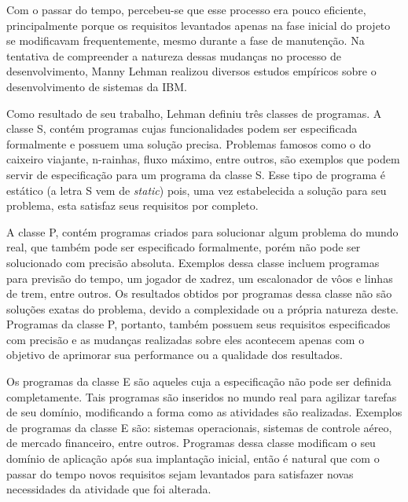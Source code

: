 \documentclass[a4paper, 12pt, twoside]{book}
\begin{document}
        Com o passar do tempo, percebeu-se que esse processo era pouco eficiente, 
        principalmente porque os requisitos levantados apenas na fase inicial do projeto se 
        modificavam frequentemente, mesmo durante a fase de manutenção. Na tentativa de compreender
        a natureza dessas mudanças no processo de desenvolvimento, Manny Lehman realizou diversos 
        estudos empíricos sobre o desenvolvimento de sistemas da IBM.
        
        Como resultado de seu trabalho, Lehman definiu três classes de programas. A classe S, contém 
        programas cujas funcionalidades podem ser especificada formalmente e possuem uma solução
        precisa. Problemas famosos como o do caixeiro viajante, n-rainhas, fluxo máximo, entre 
        outros, são exemplos que podem servir de especificação para um programa da classe S. Esse 
        tipo de programa é estático (a letra S vem de \textit{static}) pois, uma vez estabelecida a 
        solução para seu problema, esta satisfaz seus requisitos por completo.
        
        A classe P, contém programas criados para solucionar algum problema do mundo real, que também 
        pode ser especificado formalmente, porém não pode ser solucionado com precisão absoluta. 
        Exemplos dessa classe incluem programas para previsão do tempo, um jogador de xadrez, um 
        escalonador de vôos e linhas de trem, entre outros. Os resultados obtidos por programas dessa
        classe não são soluções exatas do problema, devido a complexidade ou a própria natureza deste.
        Programas da classe P, portanto, também possuem seus requisitos especificados com precisão e 
        as mudanças realizadas sobre eles acontecem apenas com o objetivo de aprimorar sua performance ou a qualidade dos resultados.
        
        Os programas da classe E são aqueles cuja a especificação não pode ser definida completamente.
        Tais programas são inseridos no mundo real para agilizar tarefas de seu domínio, modificando 
        a forma como as atividades são realizadas. Exemplos de programas da classe E são: sistemas 
        operacionais, sistemas de controle aéreo, de mercado financeiro, entre outros. Programas 
        dessa classe modificam o seu domínio de aplicação após sua implantação inicial, então é 
        natural que com o passar do tempo novos requisitos sejam levantados para satisfazer 
        novas necessidades da atividade que foi alterada. 
        
\end{document}
